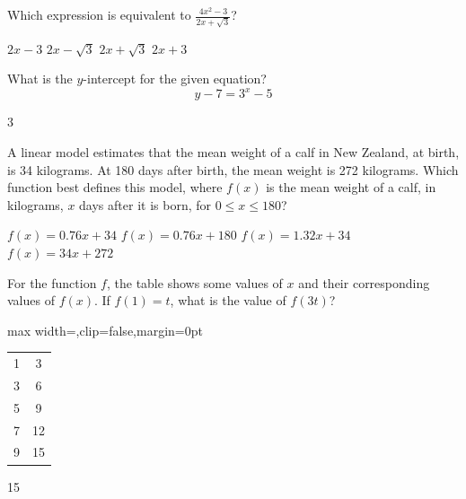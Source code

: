 \newpage





\question[1]
Which expression is equivalent to $\frac{4 x^2-3}{2 x+\sqrt{3}}$?
\begin{choices}
  \choice $2x-3$
  \CorrectChoice $2x-\sqrt{3}$
  \choice $2x+\sqrt{3}$
  \choice $2x+3$
\end{choices}

\question[1]
What is the $y$-intercept for the given equation?
\[
  y-7=3^x-5
\]
\begin{solution}
3
\end{solution}

\question[1]
A linear model estimates that the mean weight of a calf in New Zealand, at birth, is 34 kilograms. At 180 days after birth, the mean weight is 272 kilograms. Which function best defines this model, where $f(x)$ is the mean weight of a calf, in kilograms, $x$ days after it is born, for $0 \leq x \leq 180$?
\begin{choices}
  \choice $f(x)=0.76 x+34$
  \choice $f(x)=0.76 x+180$
  \CorrectChoice $f(x)=1.32 x+34$
  \choice $f(x)=34 x+272$
\end{choices}




\newpage





\question[1]
For the function $f$, the table shows some values of $x$ and their corresponding values of $f(x)$. If $f(1)=t$, what is the value of $f(3t)$?
\begin{center}
  \renewcommand{\arraystretch}{1.3}
  \setlength{\tabcolsep}{0.5em}
  \label{tab:sat-drill-09-f-sample}%
  \vspace{0.35em}
  \begin{adjustbox}{max width=\linewidth,clip=false,margin=0pt}
  \begin{tabular}{|c|c|}
    \hline
    \cellcolor[HTML]{E0E0E0}{$x$} & \cellcolor[HTML]{E0E0E0}{$f(x)$} \\
    \hline
    1 & 3 \\
    \hline
    3 & 6 \\
    \hline
    5 & 9 \\
    \hline
    7 & 12 \\
    \hline
    9 & 15 \\
    \hline
  \end{tabular}
  \end{adjustbox}
\end{center}
\begin{solution}
15
\end{solution}

